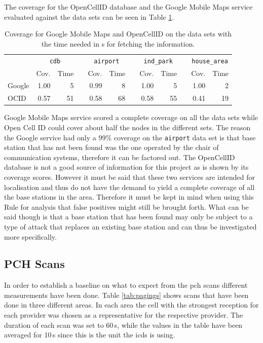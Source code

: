 The coverage for the OpenCellID database and the Google Mobile Maps service evaluated against the data sets can be seen in Table \ref{tab:coverage}.
\begin{table}
\centering
\begin{tabular}{lrrcrrcrrcrr}
\toprule
& \multicolumn{2}{c}{\texttt{cdb}} &\phantom{a}& \multicolumn{2}{c}{\texttt{airport}} &\phantom{a} & \multicolumn{2}{c}{\texttt{ind\_park}}&\phantom{a} & \multicolumn{2}{c}{\texttt{house\_area}}\\
\cmidrule{2-3} \cmidrule{5-6} \cmidrule{8-9} \cmidrule{11-12}
&Cov.&Time&	&Cov.&Time&	&Cov.&Time&	&Cov.&Time\\
\midrule
Google&		1.00&5&	&0.99&8&	&1.00&5&	&1.00&2\\
OCID&		0.57&51&	&0.58&68&	&0.58&55&	&0.41&19\\
\bottomrule
\end{tabular}
\caption{Coverage for Google Mobile Maps and OpenCellID on the data sets with the time needed in s for fetching the information.}
\label{tab:coverage}
\end{table}
Google Mobile Maps service scored a complete coverage on all the data sets while Open Cell ID could cover about half the nodes in the different sets.
The reason the Google service had only a 99\% coverage on the \texttt{airport} data set is that base station that has not been found was the one operated by the chair of communication systems, therefore it can be factored out.
The OpenCellID database is not a good source of information for this project as is shown by its coverage scores.
However it must be said that these two services are intended for localisation and thus do not have the demand to yield a complete coverage of all the base stations in the area.
Therefore it must be kept in mind when using this Rule for analysis that false positives might still be brought forth.
What can be said though is that a base station that has been found may only be subject to a type of attack that replaces an existing base station and can thus be investigated more specifically.

\subsection{PCH Scans}
In order to establish a baseline on what to expect from the \gls{pch} scans different measurements have been done.
Table \ref{tab:pagings} shows scans that have been done in three different areas.
In each area the cell with the strongest reception for each provider was chosen as a representative for the respective provider.
The duration of each scan was set to 60\,s, while the values in the table have been averaged for 10\,s since this is the unit the \gls{icds} is using.


